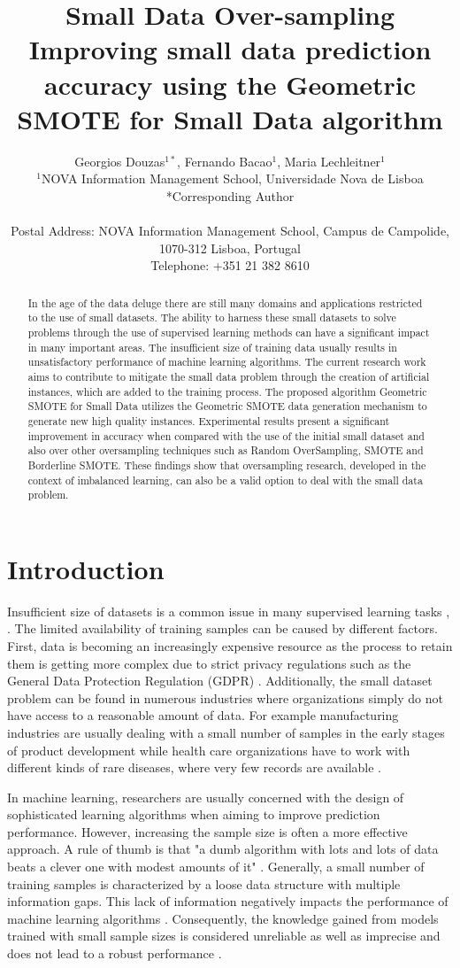 \documentclass[parskip=full]{scrartcl}
\title{Small Data Over-sampling  \\ \LARGE{Improving small data prediction accuracy using the Geometric SMOTE for Small Data algorithm}}
\author{
	Georgios Douzas\(^{1*}\), Fernando Bacao\(^{1}\), Maria Lechleitner\(^{1}\) 
	\\
	\small{\(^{1}\)NOVA Information Management School, Universidade Nova de Lisboa}
	\\
	\small{*Corresponding Author}
	\\
	\\
	\small{Postal Address: NOVA Information Management School, Campus de Campolide, 1070-312 Lisboa, Portugal}
	\\
	\small{Telephone: +351 21 382 8610}
}
\date{}
\begin{document}
\maketitle

\begin{abstract}
In the age of the data deluge there are still many domains and applications restricted to the use of small datasets. The ability to harness these small datasets to solve problems through the use of supervised learning methods can have a significant impact in many important areas. The insufficient size of training data usually results in unsatisfactory performance of machine learning algorithms. The current research work aims to contribute to mitigate the small data problem through the creation of artificial instances, which are added to the training process. The proposed algorithm Geometric SMOTE for Small Data utilizes the Geometric SMOTE data generation mechanism to generate new high quality instances. Experimental results present a significant improvement in accuracy when compared with the use of the initial small dataset and also over other oversampling techniques such as Random OverSampling, SMOTE and Borderline SMOTE. These findings show that oversampling research, developed in the context of imbalanced learning, can also be a valid option to deal with the small data problem.
\end{abstract}

\section{Introduction}
Insufficient size of datasets is a common issue in many supervised learning tasks \cite{Niyogi.1998}, \cite{AbdulLateh.2017}. The limited availability of training samples can be caused by different factors. First, data is becoming an increasingly expensive resource \cite{Li.2007} as the process to retain them is getting more complex due to strict privacy regulations such as the General Data Protection Regulation (GDPR) \cite{EuropeanCommission.2019}. Additionally, the small dataset problem can be found in numerous industries where organizations simply do not have access to a reasonable amount of data. For example manufacturing industries are usually dealing with a small number of samples in the early stages of product development while health care organizations have to work with different kinds of rare diseases, where very few records are available \cite{AbdulLateh.2017}.

In machine learning, researchers are usually concerned with the design of sophisticated learning algorithms when aiming to improve prediction performance. However, increasing the sample size is often a more effective approach. A rule of thumb is that "a dumb algorithm with lots and lots of data beats a clever one with modest amounts of it" \cite{Domingos.2012}. Generally, a small number of training samples is characterized by a loose data structure with multiple information gaps. This lack of information negatively impacts the performance of machine learning algorithms \cite{Lin.2018}. Consequently, the knowledge gained from models trained with small sample sizes is considered unreliable as well as imprecise and does not lead to a robust performance \cite{AbdulLateh.2017}.
\end{document}
